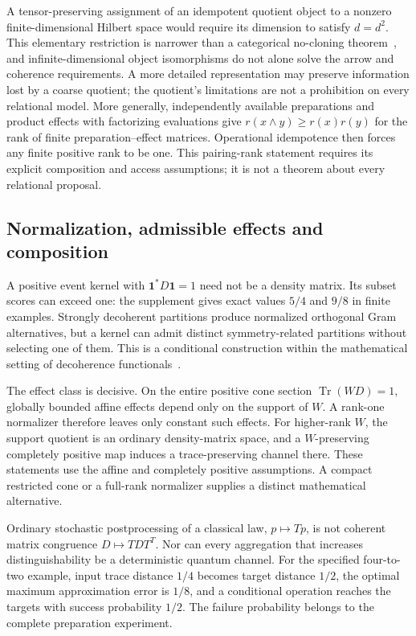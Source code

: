 A tensor-preserving assignment of an idempotent quotient object to a nonzero finite-dimensional Hilbert space would require its dimension to satisfy $d=d^2$. This elementary restriction is narrower than a categorical no-cloning theorem~\cite{abramsky}, and infinite-dimensional object isomorphisms do not alone solve the arrow and coherence requirements. A more detailed representation may preserve information lost by a coarse quotient; the quotient's limitations are not a prohibition on every relational model. More generally, independently available preparations and product effects with factorizing evaluations give $r(x\wedge y)\ge r(x)r(y)$ for the rank of finite preparation--effect matrices. Operational idempotence then forces any finite positive rank to be one. This pairing-rank statement requires its explicit composition and access assumptions; it is not a theorem about every relational proposal.

\subsection{Normalization, admissible effects and composition}

A positive event kernel with $\mathbf1^*D\mathbf1=1$ need not be a density matrix. Its subset scores can exceed one: the supplement gives exact values $5/4$ and $9/8$ in finite examples. Strongly decoherent partitions produce normalized orthogonal Gram alternatives, but a kernel can admit distinct symmetry-related partitions without selecting one of them. This is a conditional construction within the mathematical setting of decoherence functionals~\cite{sorkin,boes}.

The effect class is decisive. On the entire positive cone section $\operatorname{Tr}(WD)=1$, globally bounded affine effects depend only on the support of $W$. A rank-one normalizer therefore leaves only constant such effects. For higher-rank $W$, the support quotient is an ordinary density-matrix space, and a $W$-preserving completely positive map induces a trace-preserving channel there. These statements use the affine and completely positive assumptions. A compact restricted cone or a full-rank normalizer supplies a distinct mathematical alternative.

Ordinary stochastic postprocessing of a classical law, $p\mapsto Tp$, is not coherent matrix congruence $D\mapsto TDT^T$. Nor can every aggregation that increases distinguishability be a deterministic quantum channel. For the specified four-to-two example, input trace distance $1/4$ becomes target distance $1/2$, the optimal maximum approximation error is $1/8$, and a conditional operation reaches the targets with success probability $1/2$. The failure probability belongs to the complete preparation experiment.

